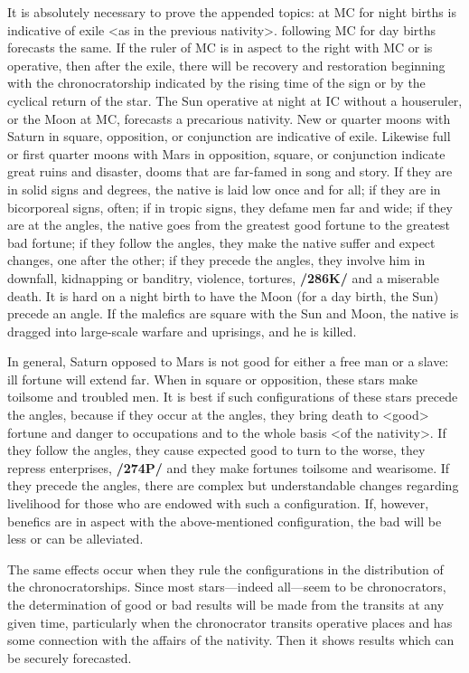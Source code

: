It is absolutely necessary to prove the appended topics: \Saturn\xspace at MC for night births is indicative of exile <as in the previous nativity>. \Mars\xspace following MC for day births forecasts the same. If the ruler of MC is in aspect to the right with MC or is operative, then after the exile, there will be recovery and
restoration beginning with the chronocratorship indicated by the rising time of the sign or by the cyclical return of the star. The Sun operative at night at IC without a houseruler, or the Moon at MC, forecasts a precarious nativity. New or quarter moons with Saturn in square, opposition, or conjunction are indicative of exile. Likewise full or first quarter moons with Mars in opposition, square, or conjunction indicate great ruins and disaster, dooms that are far-famed in song and story. If they are in solid signs and degrees, the native is laid low once and for all; if they are in bicorporeal signs, often; if in tropic signs, they defame men far and wide; if they are at the angles, the native goes from the greatest good fortune to the greatest bad fortune; if they follow the angles, they make the native suffer and expect changes, one after the other; if they precede the angles, they involve him in downfall, kidnapping or banditry, violence, tortures, \textbf{/286K/} and a miserable death. It is hard on a night birth to have the Moon (for a day birth, the Sun) precede an angle. If the malefics are square with the Sun and Moon, the native is dragged into large-scale warfare and uprisings, and he is killed.

In \mndl general, Saturn opposed to Mars is not good for either a free man or a slave: ill fortune will extend far. When in square or opposition, these stars make toilsome and troubled men. It is best if such configurations of these stars precede the angles, because if they occur at the angles, they bring death to <good> fortune and danger to occupations and to the whole basis <of the nativity>. If they follow the angles, they cause expected good to turn to the worse, they repress enterprises, \textbf{/274P/} and they make fortunes toilsome and wearisome. If they precede the angles, there are complex but understandable changes regarding livelihood for those who are endowed with such a configuration. If, however, benefics are in aspect with the above-mentioned configuration, the bad will be less or can be alleviated.

The \mnt same effects occur when they rule the configurations in the distribution of the chronocratorships. Since most stars—indeed all—seem to be chronocrators, the determination of good or bad results will be made from the transits at any given time, particularly when the chronocrator transits operative places and has some connection with the affairs of the nativity. Then it shows results which can be securely
forecasted.

